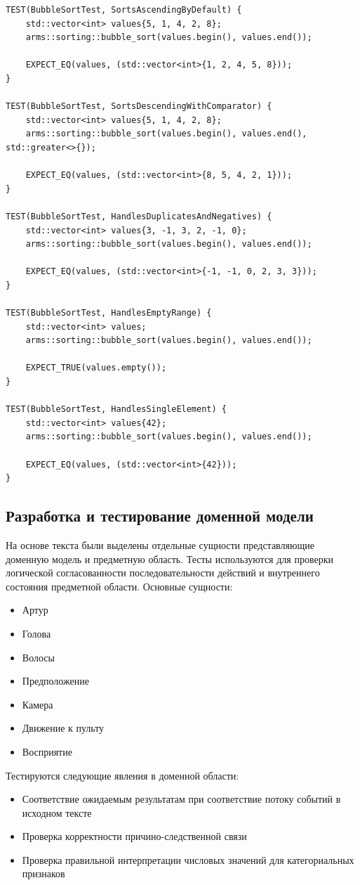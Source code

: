 \documentclass[12pt,a4paper]{report}
\begin{document}
\begin{verbatim}
TEST(BubbleSortTest, SortsAscendingByDefault) {
    std::vector<int> values{5, 1, 4, 2, 8};
    arms::sorting::bubble_sort(values.begin(), values.end());

    EXPECT_EQ(values, (std::vector<int>{1, 2, 4, 5, 8}));
}

TEST(BubbleSortTest, SortsDescendingWithComparator) {
    std::vector<int> values{5, 1, 4, 2, 8};
    arms::sorting::bubble_sort(values.begin(), values.end(), std::greater<>{});

    EXPECT_EQ(values, (std::vector<int>{8, 5, 4, 2, 1}));
}

TEST(BubbleSortTest, HandlesDuplicatesAndNegatives) {
    std::vector<int> values{3, -1, 3, 2, -1, 0};
    arms::sorting::bubble_sort(values.begin(), values.end());

    EXPECT_EQ(values, (std::vector<int>{-1, -1, 0, 2, 3, 3}));
}

TEST(BubbleSortTest, HandlesEmptyRange) {
    std::vector<int> values;
    arms::sorting::bubble_sort(values.begin(), values.end());

    EXPECT_TRUE(values.empty());
}

TEST(BubbleSortTest, HandlesSingleElement) {
    std::vector<int> values{42};
    arms::sorting::bubble_sort(values.begin(), values.end());

    EXPECT_EQ(values, (std::vector<int>{42}));
}
\end{verbatim}
\subsection*{Разработка и тестирование доменной модели}
На основе текста были выделены отдельные сущности представляющие доменную модель и предметную область. Тесты используются для проверки логической согласованности последовательности действий и внутреннего состояния предметной области. Основные сущности:
\begin{itemize}
    \item Артур
    \item Голова
    \item Волосы
    \item Предположение
    \item Камера
    \item Движение к пульту
    \item Восприятие
\end{itemize}
Тестируются следующие явления в доменной области:
\begin{itemize}
    \item Соответствие ожидаемым результатам при соответствие потоку событий в исходном тексте
    \item Проверка корректности причино-следственной связи
    \item Проверка правильной интерпретации числовых значений для категориальных признаков
\end{itemize}
\end{document}
